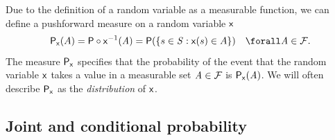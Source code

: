 Due to the definition of a random variable as a measurable function, we can define a pushforward measure on a random variable $\mathsf{x}$
\begin{equation}
  \prob{\rvar{x}}(A) 
  = \probability\circ\rvar{x}^{-1}(\set{A})
  = \probability\lpa \lbr s \in \set{S}: \rvar{x}(s) \in A \rbr \rpa
  \quad \forall \set{A} \in \sset{F}.
\end{equation}
The measure $\mathsf{P}_{\mathsf{x}}$ specifies that the probability of the event that the random variable $\mathsf{x}$ takes a value in a measurable set $\mathit{A} \in \mathcal{F}$ is $\mathsf{P}_{\mathsf{x}}(\mathit{A})$. We will often describe $\mathsf{P}_{\mathsf{x}}$ as the \emph{distribution} of $\mathsf{x}$.


\subsection{Joint and conditional probability}\label{subsec:joint-and-conditional-probabilities}

